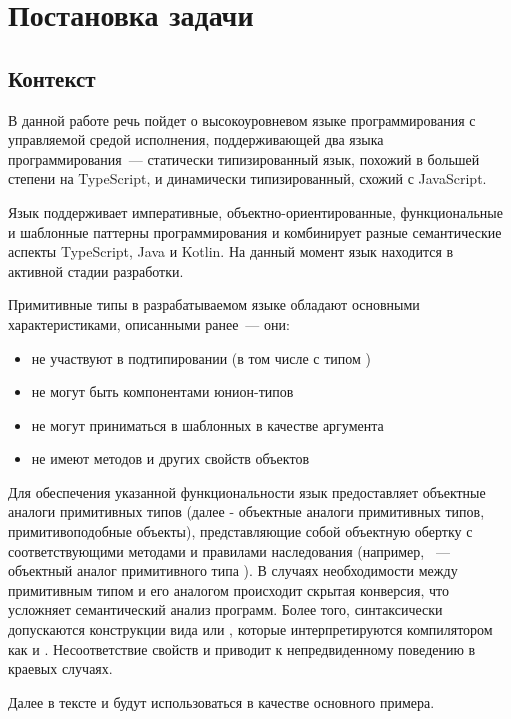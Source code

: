 \newpage
\section{Постановка задачи}
\label{sec:Chapter1} 

\subsection{Контекст}
В данной работе речь пойдет о высокоуровневом языке программирования с управляемой средой исполнения, поддерживающей два языка программирования~--- статически типизированный язык, похожий в большей степени на TypeScript, и динамически типизированный, схожий с JavaScript.

Язык поддерживает императивные, объектно-ориентированные, функциональные и шаблонные паттерны программирования и комбинирует разные семантические аспекты TypeScript, Java и Kotlin. На данный момент язык находится в активной стадии разработки.

Примитивные типы в разрабатываемом языке обладают основными характеристиками, описанными ранее~--- они:
\begin{itemize}
    \item не участвуют в подтипировании (в том числе с типом )
    \item не могут быть компонентами юнион-типов
    \item не могут приниматься в шаблонных в качестве аргумента
    \item не имеют методов и других свойств объектов
\end{itemize}

Для обеспечения указанной функциональности язык предоставляет объектные аналоги примитивных типов (далее - объектные аналоги примитивных типов, примитивоподобные объекты), представляющие собой объектную обертку с соответствующими методами и правилами наследования (например, ~--- объектный аналог примитивного типа ).
В случаях необходимости между примитивным типом и его аналогом происходит скрытая конверсия, что усложняет семантический анализ программ. Более того, синтаксически допускаются конструкции вида  или , которые интерпретируются компилятором как  и . Несоответствие свойств  и  приводит к непредвиденному поведению в краевых случаях.

Далее в тексте  и  будут использоваться в качестве основного примера.

